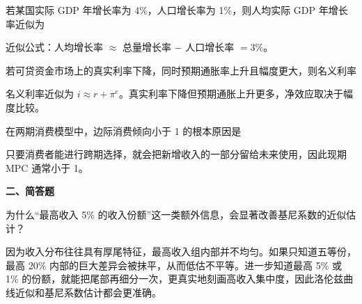 \begin{question}
若某国实际 GDP 年增长率为 4\%，人口增长率为 1\%，则人均实际 GDP 年增长率近似为
\begin{choiceoptions}[2]
\end{choiceoptions}
\begin{solution}
近似公式：人均增长率 $\approx$ 总量增长率 $-$ 人口增长率 $=3\%$。
\end{solution}
\end{question}

\begin{question}
若可贷资金市场上的真实利率下降，同时预期通胀率上升且幅度更大，则名义利率
\begin{choiceoptions}[2]
\end{choiceoptions}
\begin{solution}
名义利率近似为 $i\approx r+\pi^e$。真实利率下降但预期通胀上升更多，净效应取决于幅度比较。
\end{solution}
\end{question}

\begin{question}
在两期消费模型中，边际消费倾向小于 1 的根本原因是
\begin{choiceoptions}[1]
\end{choiceoptions}
\begin{solution}
只要消费者能进行跨期选择，就会把新增收入的一部分留给未来使用，因此现期 MPC 通常小于 1。
\end{solution}
\end{question}

\textbf{二、简答题}

\begin{question}
为什么“最高收入 5\% 的收入份额”这一类额外信息，会显著改善基尼系数的近似估计？
\begin{solution}
因为收入分布往往具有厚尾特征，最高收入组内部并不均匀。如果只知道五等份，最高 20\% 内部的巨大差异会被抹平，从而低估不平等。进一步知道最高 5\% 或 1\% 的份额，就能把尾部再细分一次，更真实地刻画高收入集中度，因此洛伦兹曲线近似和基尼系数估计都会更准确。\end{solution}
\end{question}

